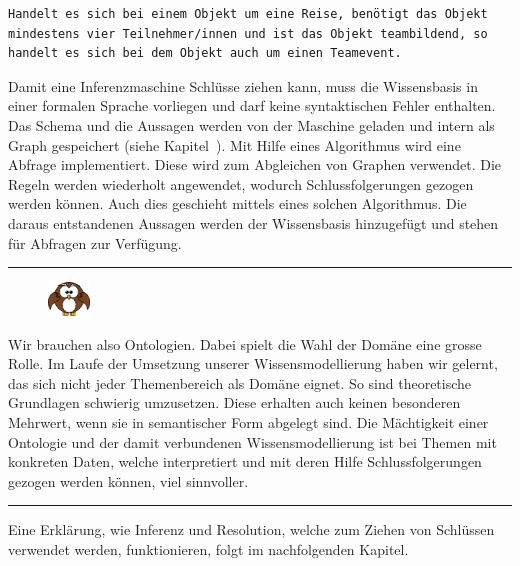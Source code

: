 \begin{lstlisting}[caption={Beispiel einer Regel in einer Wissensbasis.}]
Handelt es sich bei einem Objekt um eine Reise, benötigt das Objekt mindestens vier Teilnehmer/innen und ist das Objekt teambildend, so handelt es sich bei dem Objekt auch um einen Teamevent.
\end{lstlisting}

Damit eine Inferenzmaschine Schlüsse ziehen kann, muss die Wissensbasis in einer formalen Sprache vorliegen und darf keine syntaktischen Fehler enthalten. Das Schema und die Aussagen werden von der Maschine geladen und intern als Graph gespeichert (siehe Kapitel~). Mit Hilfe eines Algorithmus wird eine Abfrage implementiert. Diese wird zum Abgleichen von Graphen verwendet. Die Regeln werden wiederholt angewendet, wodurch Schlussfolgerungen gezogen werden können. Auch dies geschieht mittels eines solchen Algorithmus. Die daraus entstandenen Aussagen werden der Wissensbasis hinzugefügt und stehen für Abfragen zur Verfügung.

\noindent\rule[1ex]{\textwidth}{1pt}
\begin{figure}
    \vspace{-14pt}
    \includegraphics[width=0.1\textwidth]{bilder/owl.png}
\end{figure}
Wir brauchen also Ontologien. Dabei spielt die Wahl der Domäne eine grosse Rolle. Im Laufe der Umsetzung unserer Wissensmodellierung haben wir gelernt, das sich nicht jeder Themenbereich als Domäne eignet. So sind theoretische Grundlagen schwierig umzusetzen. Diese erhalten auch keinen besonderen Mehrwert, wenn sie in semantischer Form abgelegt sind. Die Mächtigkeit einer Ontologie und der damit verbundenen Wissensmodellierung ist bei Themen mit konkreten Daten, welche interpretiert und mit deren Hilfe Schlussfolgerungen gezogen werden können, viel sinnvoller.
\noindent\rule[1ex]{\textwidth}{1pt}

Eine Erklärung, wie Inferenz und Resolution, welche zum Ziehen von Schlüssen verwendet werden, funktionieren, folgt im nachfolgenden Kapitel.
